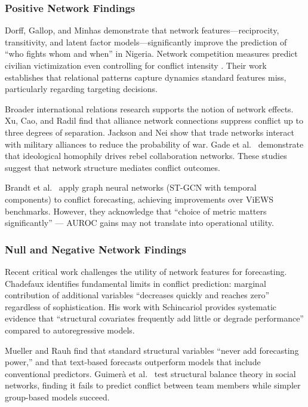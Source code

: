 \documentclass[pdflatex,sn-mathphys-num]{sn-jnl}%
\theoremstyle{thmstyleone}%
\theoremstyle{thmstyletwo}%
\theoremstyle{thmstylethree}%
\begin{document}
\subsubsection{Positive Network Findings}

Dorff, Gallop, and Minhas \cite{dorff2020networks, dorff2023competition} demonstrate that network features---reciprocity, transitivity, and latent factor models---significantly improve the prediction of ``who fights whom and when'' in Nigeria. Network competition measures predict civilian victimization even controlling for conflict intensity \cite{dorff2023competition}. Their work establishes that relational patterns capture dynamics standard features miss, particularly regarding targeting decisions.

Broader international relations research supports the notion of network effects. Xu, Cao, and Radil \cite{xu2017threedegree} find that alliance network connections suppress conflict up to three degrees of separation. Jackson and Nei \cite{jackson2015networks} show that trade networks interact with military alliances to reduce the probability of war. Gade et al.~\cite{gade2019cooperation} demonstrate that ideological homophily drives rebel collaboration networks. These studies suggest that network structure mediates conflict outcomes.

Brandt et al.~\cite{brandt2022stgcn} apply graph neural networks (ST-GCN with temporal components) to conflict forecasting, achieving improvements over ViEWS benchmarks. However, they acknowledge that ``choice of metric matters significantly'' — AUROC gains may not translate into operational utility.

\subsubsection{Null and Negative Network Findings}

Recent critical work challenges the utility of network features for forecasting. Chadefaux \cite{chadefaux2017conflict} identifies fundamental limits in conflict prediction: marginal contribution of additional variables ``decreases quickly and reaches zero'' regardless of sophistication. His work with Schincariol \cite{chadefaux2025endogenous} provides systematic evidence that ``structural covariates frequently add little or degrade performance'' compared to autoregressive models.

Mueller and Rauh \cite{mueller2022hard} find that standard structural variables ``never add forecasting power,'' and that text-based forecasts outperform models that include conventional predictors. Guimerà et al.~\cite{rovira2013predicting} test structural balance theory in social networks, finding it fails to predict conflict between team members while simpler group-based models succeed.
\end{document}
